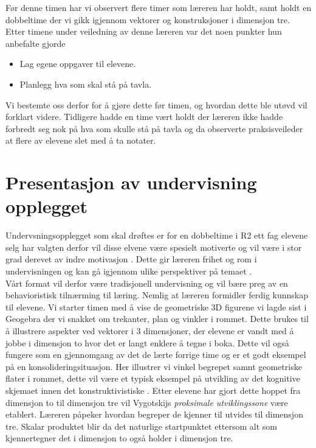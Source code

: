 \documentclass[11pt]{article}
\begin{document}
Før denne timen har vi observert flere timer som læreren har holdt, samt holdt en dobbeltime der vi gikk igjennom vektorer og konstruksjoner i dimensjon tre.\\
Etter  timene under veiledning av denne læreren var det noen punkter hun anbefalte gjorde
\begin{itemize}
\item Lag egene oppgaver til elevene.
\item Planlegg hva som skal stå på tavla.
\end{itemize}
Vi bestemte oss derfor for å gjøre dette før timen, og hvordan dette ble utøvd vil forklart videre. Tidligere hadde en time vært holdt der læreren ikke hadde forbredt seg nok på hva som skulle stå på tavla og da observerte praksisveileder at flere av elevene slet med å ta notater.

\section{Presentasjon av undervisning opplegget}
\label{sec-2}
Undervsningsopplegget som skal drøftes er for en dobbeltime i R2 ett fag elevene selg har valgten derfor vil disse elvene være spesielt motiverte og vil være i stor grad derevet av indre motivasjon \citep{KletteH}. Dette gir læreren frihet og rom i undervisningen og kan gå igjennom ulike perspektiver på temaet \citep{Ball}.\\

Vårt format vil derfor være tradisjonell undervisning og vil bære preg av en behavioristisk tilnærming \citep{Saljo} til læring. Nemlig at læreren formidler ferdig kunnskap til elevene. Vi starter timen med å vise de geometriske 3D figurene vi lagde sist i Geogebra der vi snakket om trekanter, plan og vinkler i rommet. Dette brukes til å illustrere aspekter ved vektorer i 3 dimensjoner, der elevene er vandt med å jobbe i dimensjon to hvor det er langt enklere å tegne i boka. Dette vil også fungere som en gjennomgang av det de lærte forrige time og er et godt eksempel på en konsolideringsituasjon. Her illustrer vi vinkel begrepet samnt geometriske flater i rommet, dette vil være et typisk eksempel på utvikling av det kognitive skjemaet innen det konstruktivistiske  \citep{Saljo}. Etter elevene har gjort dette hoppet fra dimensjon to til dimensjon tre vil Vygotskijs \emph{proksimale utviklingssone} være etablert. Læreren påpeker hvordan begreper de kjenner til utvides til dimensjon tre. Skalar produktet blir da det naturlige startpunktet ettersom alt som kjennertegner det i dimensjon to også holder i dimensjon tre. 
\end{document}
